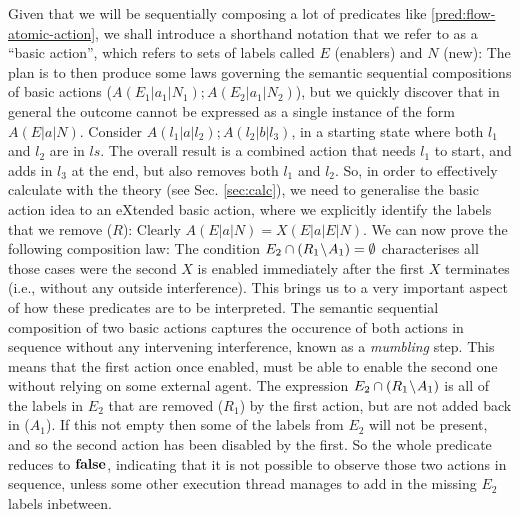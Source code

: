 Given that we will be sequentially composing a lot of predicates
like \ref{pred:flow-atomic-action},
we shall introduce a shorthand notation that we refer to as
a ``basic action'',
which refers to sets of labels called $E$ (enablers) and $N$ (new):
The plan is to then produce some laws governing
the semantic sequential compositions of basic actions
($A(E_1|a_1|N_1);A(E_2|a_1|N_2)$),
but we quickly discover that
in general the outcome cannot be expressed as a single instance
of the form $A(E|a|N)$.
Consider $A(l_1|a|l_2);A(l_2|b|l_3)$,
in a starting state where both $l_1$ and $l_2$ are in $ls$.
The overall result is a combined action that needs $l_1$
to start, and adds in $l_3$ at the end,
but also removes both $l_1$ and $l_2$.
So, in order to effectively calculate with the theory
(see Sec. \ref{sec:calc}), we need to generalise the basic action idea
to an eXtended basic action,
where we explicitly identify the labels that we remove ($R$):
Clearly $A(E|a|N) = X(E|a|E|N)$.
We can now prove the following composition law:
The condition $E_2 \cap (R_1\!\setminus\! A_1) = \emptyset$
characterises all those cases were the second $X$ is enabled
immediately after the first $X$ terminates
(i.e., without any outside interference).
This brings us to a very important aspect of how these predicates are to be
interpreted.
The semantic sequential composition of two basic actions
captures the occurence of both actions in sequence without any intervening
interference, known as a \emph{mumbling} step.
This means that the first action once enabled,
must be able to enable the second one without relying on some external agent.
The expression $E_2 \cap (R_1\!\setminus\! A_1)$ is all of the labels in $E_2$
that are removed ($R_1$) by the first action, but are not added back in ($A_1$).
If this not empty then some of the labels from $E_2$ will not be present,
and so the second action has been disabled by the first.
So the whole predicate reduces to $\mathbf{false}$,
indicating that it is not possible to observe those two actions in sequence,
unless some other execution thread manages to add in the missing $E_2$ labels
inbetween.

